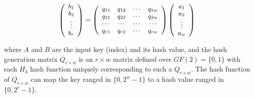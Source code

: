\documentclass[10pt,journal,compsoc]{IEEEtran}
\begin{document}
\begin{equation}
\footnotesize
\left( {\begin{array}{*{20}{c}}
   {{b_1}}  \\
   {{b_2}}  \\
    \vdots   \\
   {{b_r}}  \\
\end{array}} \right) = \left( {\begin{array}{*{20}{c}}
   {{q_{11}}} & {{q_{12}}} &  \cdots  & {{q_{1w}}}  \\
   {{q_{21}}} & {{q_{22}}} &  \cdots  & {{q_{2w}}}  \\
    \cdots  &  \cdots  &  \cdots  &  \cdots   \\
   {{q_{r1}}} & {{q_{r2}}} &  \cdots  & {{q_{rw}}}  \\
\end{array}} \right)\left( {\begin{array}{*{20}{c}}
   {{a_1}}  \\
   {{a_2}}  \\
    \vdots   \\
   {{a_w}}  \\
\end{array}} \right)
\label{eq:h3hash}
\end{equation}

\noindent where $A$ and $B$ are the input key (index) and its hash value, and the hash generation matrix ${Q_{r \times w}}$ is an $r \times w$ matrix defined over $GF(2)=\{0,1\}$ with each $H_3$ hash function uniquely corresponding to such a ${Q_{r \times w}}$. The hash function of ${Q_{r \times w}}$ can map the key ranged in $\{0,{2^w} - 1\}$ to a hash value ranged in $\{0,{2^r} - 1\}$.
\end{document}
